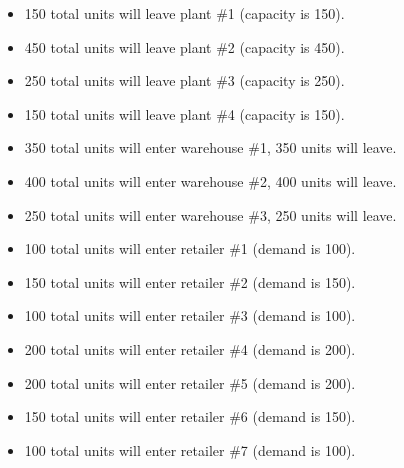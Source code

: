 \documentclass[../report/main.tex]{subfiles}
\begin{document}
\begin{itemize}
	\newline
	\item 150 total units will leave plant \#1 (capacity is 150).
	\item 450 total units will leave plant \#2 (capacity is 450).
	\item 250 total units will leave plant \#3 (capacity is 250).
	\item 150 total units will leave plant \#4 (capacity is 150).
	\newline
	\item 350 total units will enter warehouse \#1, 350 units will leave.
	\item 400 total units will enter warehouse \#2, 400 units will leave.
	\item 250 total units will enter warehouse \#3, 250 units will leave.
	\newline
	\item 100 total units will enter retailer \#1 (demand is 100).
	\item 150 total units will enter retailer \#2 (demand is 150).
	\item 100 total units will enter retailer \#3 (demand is 100).
	\item 200 total units will enter retailer \#4 (demand is 200).
	\item 200 total units will enter retailer \#5 (demand is 200).
	\item 150 total units will enter retailer \#6 (demand is 150).
	\item 100 total units will enter retailer \#7 (demand is 100).
\end{itemize}
\end{document}
